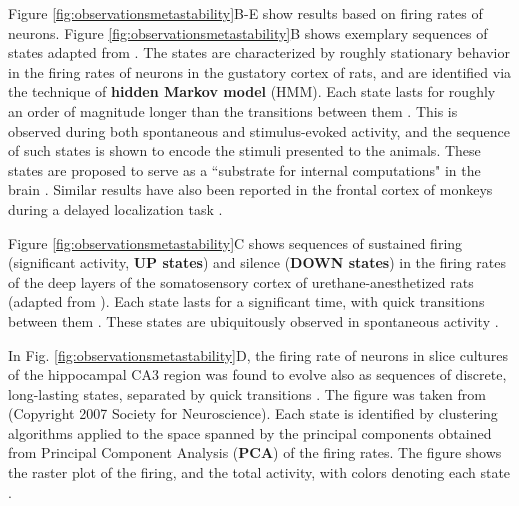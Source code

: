 \documentclass[reprint,onecolumn,superscriptaddress,showpacs,amsmath,amssymb,aps,floatfix]{revtex4-2}
\theoremstyle{definition}
\newcommand{\Emph}[1]{\textbf{#1}}
\begin{document}
Figure \ref{fig:observationsmetastability}B-E show results based on firing rates of neurons.
Figure \ref{fig:observationsmetastability}B shows exemplary sequences of states adapted from \cite{brinkman2022metastable}. The states are characterized by roughly stationary behavior in the firing rates of neurons in the gustatory cortex of rats, and are identified via the technique of \Emph{hidden Markov model} (HMM). Each state lasts for roughly an order of magnitude longer than the transitions between them \cite{jones2007natural, lacamera2019cortical, mazzucato2019expectation, recanatesi2021metastable, brinkman2022metastable}. This is observed during both spontaneous and stimulus-evoked activity, and the sequence of such states is shown to encode the stimuli \cite{lacamera2019cortical, mazzucato2019expectation} presented to the animals. These states are proposed to serve as a ``substrate for internal computations" in the brain \cite{lacamera2019cortical}. Similar results have also been reported in the frontal cortex of monkeys during a delayed localization task \cite{abeles1995cortical, seidemann1996simultaneously}.

Figure \ref{fig:observationsmetastability}C shows sequences of sustained firing (significant activity, \Emph{UP states}) and silence (\Emph{DOWN states}) in the firing rates of the deep layers of the somatosensory cortex of urethane-anesthetized rats (adapted from \cite{jercog2017updown}). Each state lasts for a significant time, with quick transitions between them \cite{jercog2017updown}. These states are ubiquitously observed in spontaneous activity \cite{luczak2007sequential, jercog2017updown}. 

In Fig. \ref{fig:observationsmetastability}D, the firing rate of neurons in slice cultures of the hippocampal CA3 region was found to evolve also as sequences of discrete, long-lasting states, separated by quick transitions \cite{sasaki2007metastability}. The figure was taken from \cite{sasaki2007metastability} (Copyright 2007 Society for Neuroscience). Each state is identified by clustering algorithms applied to the space spanned by the principal components obtained from Principal Component Analysis (\Emph{PCA}) of the firing rates. The figure shows the raster plot of the firing, and the total activity, with colors denoting each state \cite{sasaki2007metastability}.
\end{document}
